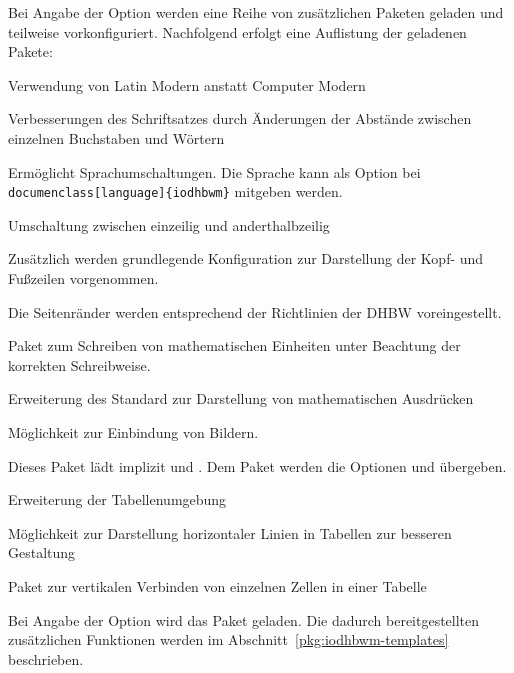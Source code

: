 \documentclass[babel=ngerman,highlight=false]{skdoc}
\begin{document}
            Bei Angabe der Option  werden eine Reihe von zusätzlichen Paketen geladen und teilweise vorkonfiguriert. Nachfolgend erfolgt eine Auflistung der geladenen Pakete:
            \begin{description}[itemsep=1pt, style=multiline, leftmargin=3cm]
                \item [\pkg{lmodern}] Verwendung von Latin Modern anstatt Computer Modern
                \item [\pkg{microtype}] Verbesserungen des Schriftsatzes durch Änderungen der Abstände zwischen einzelnen Buchstaben und Wörtern
                \item [\pkg{babel}] Ermöglicht Sprachumschaltungen. Die Sprache kann als Option bei \verb|documenclass[language]{iodhbwm}| mitgeben werden.
                \item [\pkg{setspace}] Umschaltung zwischen einzeilig und anderthalbzeilig
                \item [\pkg{scrlayer-srcpage}] Zusätzlich werden grundlegende Konfiguration zur Darstellung der Kopf- und Fußzeilen vorgenommen.
                \item [\pkg{geometry}] Die Seitenränder werden entsprechend der Richtlinien der DHBW voreingestellt.
                \item [\pkg{siunitx}] Paket zum Schreiben von mathematischen Einheiten unter Beachtung der korrekten Schreibweise.
                \item [\pkg{mathtools}] Erweiterung des Standard zur Darstellung von mathematischen Ausdrücken
                \item [\pkg{graphicx}] Möglichkeit zur Einbindung von Bildern.
                \item [\pkg{tcolobox}] Dieses Paket lädt implizit  und . Dem Paket  werden die Optionen  und  übergeben.
                \item [\pkg{tabularx}] Erweiterung der Tabellenumgebung
                \item [\pkg{booktabs}] Möglichkeit zur Darstellung horizontaler Linien in Tabellen zur besseren Gestaltung
                \item [\pkg{multirow}] Paket zur vertikalen Verbinden von einzelnen Zellen in einer Tabelle
            \end{description}

            Bei Angabe der Option wird das Paket  geladen. Die dadurch bereitgestellten zusätzlichen Funktionen werden im Abschnitt~\ref{pkg:iodhbwm-templates} beschrieben.\medskip
\end{document}
